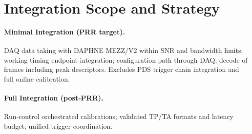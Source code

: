 
\section{Integration Scope and Strategy}\label{sec:int-scope}
\paragraph{Minimal Integration (PRR target).}
DAQ data taking with DAPHNE MEZZ/V2 within SNR and bandwidth limits; working timing endpoint integration; configuration path through DAQ; decode of frames including peak descriptors. Excludes PDS trigger chain integration and full online calibration.
\paragraph{Full Integration (post‑PRR).}
Run‑control orchestrated calibrations; validated TP/TA formats and latency budget; unified trigger coordination.
